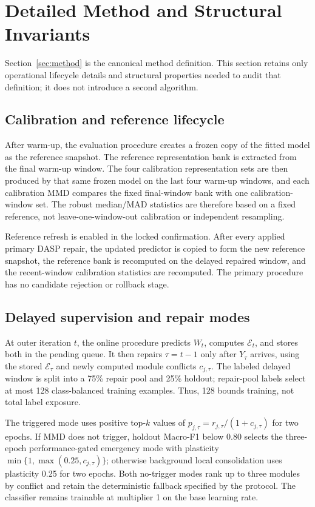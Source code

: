 \section{Detailed Method and Structural Invariants}
\label{sec:detailed-method}

Section~\ref{sec:method} is the canonical method definition. This section retains only operational lifecycle details and structural properties needed to audit that definition; it does not introduce a second algorithm.

\subsection{Calibration and reference lifecycle}
After warm-up, the evaluation procedure creates a frozen copy of the fitted model as the reference snapshot. The reference representation bank is extracted from the final warm-up window. The four calibration representation sets are then produced by that same frozen model on the last four warm-up windows, and each calibration MMD compares the fixed final-window bank with one calibration-window set. The robust median/MAD statistics are therefore based on a fixed reference, not leave-one-window-out calibration or independent resampling.

Reference refresh is enabled in the locked confirmation. After every applied primary DASP repair, the updated predictor is copied to form the new reference snapshot, the reference bank is recomputed on the delayed repaired window, and the recent-window calibration statistics are recomputed. The primary procedure has no candidate rejection or rollback stage.

\subsection{Delayed supervision and repair modes}
At outer iteration $t$, the online procedure predicts $W_t$, computes $\mathcal E_t$, and stores both in the pending queue. It then repairs $\tau=t-1$ only after $Y_{\tau}$ arrives, using the stored $\mathcal E_{\tau}$ and newly computed module conflicts $c_{j,\tau}$. The labeled delayed window is split into a 75\% repair pool and 25\% holdout; repair-pool labels select at most 128 class-balanced training examples. Thus, 128 bounds training, not total label exposure.

The triggered mode uses positive top-$k$ values of $p_{j,\tau}=r_{j,\tau}/(1+c_{j,\tau})$ for two epochs. If MMD does not trigger, holdout Macro-F1 below 0.80 selects the three-epoch performance-gated emergency mode with plasticity $\min\{1,\max(0.25,c_{j,\tau})\}$; otherwise background local consolidation uses plasticity 0.25 for two epochs. Both no-trigger modes rank up to three modules by conflict and retain the deterministic fallback specified by the protocol. The classifier remains trainable at multiplier 1 on the base learning rate.
